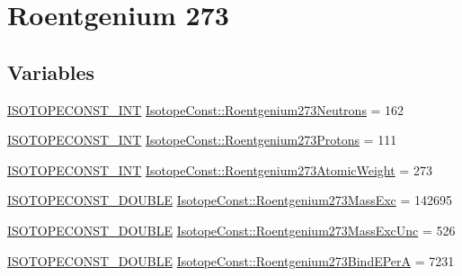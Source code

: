 \hypertarget{group___isotope_const-_roentgenium-_rg273}{}\section{Roentgenium 273}
\label{group___isotope_const-_roentgenium-_rg273}
\subsection*{Variables}
\begin{DoxyCompactItemize}
\item 
\mbox{\hyperlink{group___isotope_const-_macros_ga5f18360b3e99483a35c32d789e62621c}{I\+S\+O\+T\+O\+P\+E\+C\+O\+N\+S\+T\+\_\+\+I\+NT}} \mbox{\hyperlink{group___isotope_const-_roentgenium-_rg273_ga08154050e2538adf661326588b192941}{Isotope\+Const\+::\+Roentgenium273\+Neutrons}} = 162
\item 
\mbox{\hyperlink{group___isotope_const-_macros_ga5f18360b3e99483a35c32d789e62621c}{I\+S\+O\+T\+O\+P\+E\+C\+O\+N\+S\+T\+\_\+\+I\+NT}} \mbox{\hyperlink{group___isotope_const-_roentgenium-_rg273_gad20011ec4b5f5326aeabfcec79ca57fd}{Isotope\+Const\+::\+Roentgenium273\+Protons}} = 111
\item 
\mbox{\hyperlink{group___isotope_const-_macros_ga5f18360b3e99483a35c32d789e62621c}{I\+S\+O\+T\+O\+P\+E\+C\+O\+N\+S\+T\+\_\+\+I\+NT}} \mbox{\hyperlink{group___isotope_const-_roentgenium-_rg273_gac018cb3b35554b4c6cb079f507b7bd00}{Isotope\+Const\+::\+Roentgenium273\+Atomic\+Weight}} = 273
\item 
\mbox{\hyperlink{group___isotope_const-_macros_ga8f45a7272ce02c0b4c65c44636ed719a}{I\+S\+O\+T\+O\+P\+E\+C\+O\+N\+S\+T\+\_\+\+D\+O\+U\+B\+LE}} \mbox{\hyperlink{group___isotope_const-_roentgenium-_rg273_gaecba0c08e7bca121d8aa89217f83321a}{Isotope\+Const\+::\+Roentgenium273\+Mass\+Exc}} = 142695
\item 
\mbox{\hyperlink{group___isotope_const-_macros_ga8f45a7272ce02c0b4c65c44636ed719a}{I\+S\+O\+T\+O\+P\+E\+C\+O\+N\+S\+T\+\_\+\+D\+O\+U\+B\+LE}} \mbox{\hyperlink{group___isotope_const-_roentgenium-_rg273_ga5b9d2b1257128b650083d2693ed2f1a6}{Isotope\+Const\+::\+Roentgenium273\+Mass\+Exc\+Unc}} = 526
\item 
\mbox{\hyperlink{group___isotope_const-_macros_ga8f45a7272ce02c0b4c65c44636ed719a}{I\+S\+O\+T\+O\+P\+E\+C\+O\+N\+S\+T\+\_\+\+D\+O\+U\+B\+LE}} \mbox{\hyperlink{group___isotope_const-_roentgenium-_rg273_ga61e51cc5c5a4ce4517429850e7a4a6e2}{Isotope\+Const\+::\+Roentgenium273\+Bind\+E\+PerA}} = 7231

\end{DoxyCompactItemize}
